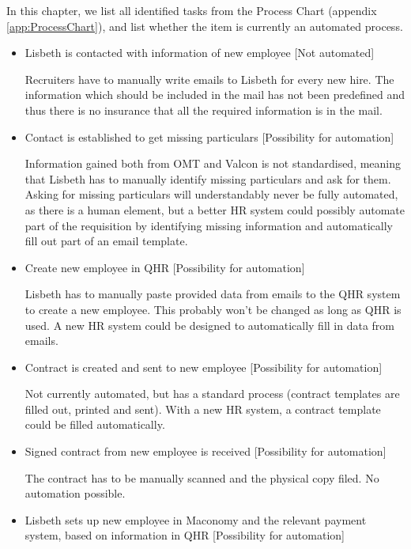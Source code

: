 In this chapter, we list all identified tasks from the Process Chart (appendix \ref*{app:ProcessChart}), and list whether the item is currently an automated process. 

\begin{itemize}
	\item{Lisbeth is contacted with information of new employee} [Not automated]
	
		Recruiters have to manually write emails to Lisbeth for every new hire. The information which should be included in the mail has not been predefined and thus there is no insurance that all the required information is in the mail.
		
	\item{Contact is established to get missing particulars} [Possibility for automation]
	
		Information gained both from OMT and Valcon is not standardised, meaning that Lisbeth has to manually identify missing particulars and ask for them. Asking for missing particulars will understandably never be fully automated, as there is a human element, but a better HR system could possibly automate part of the requisition by identifying missing information and automatically fill out part of an email template.
		
	\item{Create new employee in QHR} [Possibility for automation]
	
		Lisbeth has to manually paste provided data from emails to the QHR system to create a new employee. This probably won't be changed as long as QHR is used. A new HR system could be designed to automatically fill in data from emails.
	
	\item{Contract is created and sent to new employee} [Possibility for automation]
	
		Not currently automated, but has a standard process (contract templates are filled out, printed and sent).
		With a new HR system, a contract template could be filled automatically.
	
	\item{Signed contract from new employee is received} [Possibility for automation]
	
		The contract has to be manually scanned and the physical copy filed. No automation possible.
	
	\item{Lisbeth sets up new employee in Maconomy and the relevant payment system, based on information in QHR} [Possibility for automation]
	

\end{itemize}
